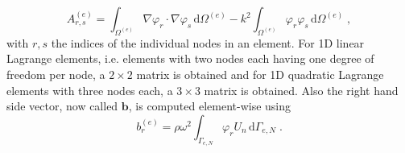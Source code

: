 \documentclass[%
  a4paper,oneside,%
  11pt,%
  smallchapters,
  style=printdev,
  extramargin,
  green,%
  rgb, <cmyk>
  ]{tubsbook}
\begin{document}
\begin{equation}
A_{r,s}^{(e)} = \int_{\Omega^{(e)}} \nabla \varphi_r \cdot \nabla \varphi_s \, \mathrm{d}\Omega^{(e)} - k^2 \int_{\Omega^{(e)}} \varphi_r \varphi_s \, \mathrm{d}\Omega^{(e)} \;,
\end{equation}
with $r,s$ the indices of the individual nodes in an element. For 1D linear Lagrange elements, i.e. elements with two nodes each having one degree of freedom per node, a $2\times 2$ matrix is obtained and for 1D quadratic Lagrange elements with three nodes each, a $3\times3$ matrix is obtained.
%
Also the right hand side vector, now called $\bm{b}$, is computed element-wise using
\begin{equation}
b_r^{(e)} = \rho \omega^2  \int_{\Gamma_{e,N}} \varphi_r U_n \,\mathrm{d}\Gamma_{e,N} \;.
\end{equation}
\end{document}
